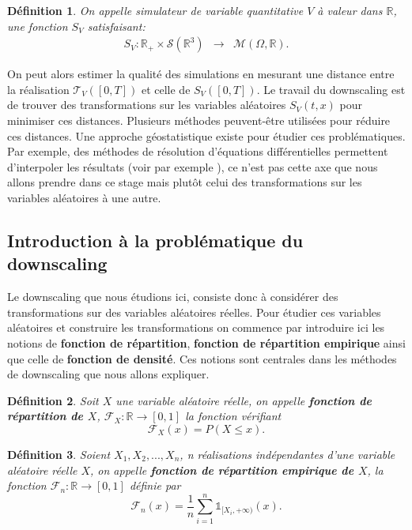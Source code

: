 \documentclass[a4paper,11pt]{article}
\numberwithin{equation}{section}
\newtheorem{definition}{Définition}
\begin{document}
\begin{definition}
	\label{simu_terre}
	On appelle simulateur de variable quantitative $V$ à valeur dans $\mathbb{R}$, une fonction $S_V$ satisfaisant:
	\begin{equation}
		\begin{array}{ccc}
			S_V: \mathbb{R}_{+}\times\mathcal{S}(\mathbb{R}^{3}) & \to & \mathcal{M}(\Omega,\mathbb{R}).
		\end{array}
	\end{equation}
\end{definition}
On peut alors estimer la qualité des simulations en mesurant une distance entre la réalisation $\mathcal{T}_V([0,T])$ et celle de $S_V([0,T])$. Le travail du downscaling est de trouver des transformations sur les variables aléatoires $S_V(t,x)$ pour minimiser ces distances. Plusieurs méthodes peuvent-être utilisées pour réduire ces distances. Une approche géostatistique  existe pour étudier ces problématiques. Par exemple, des méthodes de résolution d'équations différentielles permettent d'interpoler les résultats (voir par exemple \cite{lindgren2011explicit}), ce n'est pas cette axe que nous allons prendre dans ce stage mais plutôt celui des transformations sur les variables aléatoires à une autre.

\subsection{Introduction à la problématique du downscaling}
\label{ch:intro-dwnsc}
Le downscaling que nous étudions ici, consiste donc à considérer des transformations sur des variables aléatoires réelles. Pour étudier ces variables aléatoires et construire les transformations on commence par introduire ici les notions de \textbf{fonction de répartition}, \textbf{fonction de répartition empirique} ainsi que celle de \textbf{fonction de densité}. Ces notions sont centrales dans les méthodes de downscaling que nous allons expliquer.

\begin{definition}
	Soit $X$ une variable aléatoire réelle, on appelle \textbf{fonction de répartition de $X$}, $\mathcal{F}_{X}: \mathbb{R}\to [0,1]$ la fonction vérifiant
	\begin{equation}
		\mathcal{F}_{X}(x)=P(X\leq x).
	\end{equation}
\end{definition}

\begin{definition}
	Soient $X_1,X_2,...,X_n$, n réalisations indépendantes d'une variable aléatoire réelle $X$, on appelle \textbf{fonction de répartition empirique de $X$}, la fonction $\mathcal{F}_{n}:\mathbb{R}\to [0,1]$ définie par
	\begin{equation}
		\mathcal{F}_{n}(x)= \frac{1}{n}\sum_{i=1}^{n}\mathds{1}_{[X_i, +\infty )}(x).
	\end{equation}
\end{definition}
\end{document}
